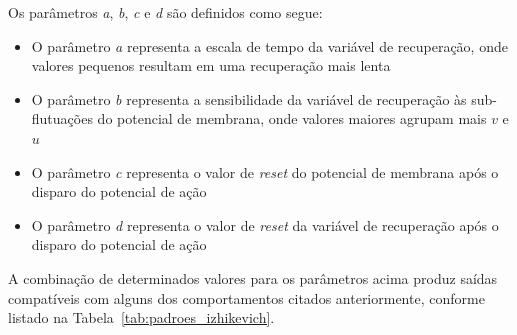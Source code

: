 Os parâmetros \textit{a}, \textit{b}, \textit{c} e \textit{d} são definidos como segue:
\begin{itemize}
	\item O parâmetro \textit{a} representa a escala de tempo da variável de recuperação, onde valores pequenos resultam em uma recuperação mais lenta
	\item O parâmetro \textit{b} representa a sensibilidade da variável de recuperação às sub-flutuações do potencial de membrana, onde valores maiores agrupam mais $v$ e $u$
	\item O parâmetro \textit{c} representa o valor de \textit{reset} do potencial de membrana após o disparo do potencial de ação
	\item O parâmetro \textit{d} representa o valor de \textit{reset} da variável de recuperação após o disparo do potencial de ação
\end{itemize}
A combinação de determinados valores para os parâmetros acima produz saídas compatíveis com alguns dos comportamentos citados anteriormente, conforme listado na Tabela~\ref{tab:padroes_izhikevich}.
\begin{table}
\end{table}

